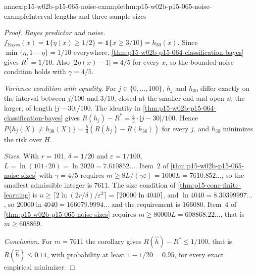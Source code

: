 \begin{annexitem}{annex:p15-w02b-p15-065-noise-example}{thm:p15-w02b-p15-065-noise-example}{Interval lengths and three sample sizes}
\begin{proof}
\emph{Bayes predictor and noise.} \(f_{\mathrm{Bayes}}(x)=
\mathbf1\{\eta(x)\geq1/2\}=\mathbf1\{x\geq3/10\}=h_{30}(x)\). Since
\(\min\{\eta,1-\eta\}=1/10\) everywhere,
\cref{thm:p15-w02b-p15-064-classification-bayes} gives \(R^{*}=1/10\).
Also \(|2\eta(x)-1|=4/5\) for every \(x\), so the bounded-noise condition
holds with \(\gamma=4/5\).

\emph{Variance condition with equality.} For \(j\in\{0,\ldots,100\}\),
\(h_j\) and \(h_{30}\) differ exactly on the interval between \(j/100\)
and \(3/10\), closed at the smaller end and open at the larger, of length
\(|j-30|/100\). The identity in
\cref{thm:p15-w02b-p15-064-classification-bayes} gives
\(R(h_j)-R^{*}=\tfrac45\cdot|j-30|/100\). Hence
\(P\{h_j(X)\ne h_{30}(X)\}=\tfrac54(R(h_j)-R(h_{30}))\) for every \(j\),
and \(h_{30}\) minimizes the risk over \(H\).

\emph{Sizes.} With \(r=101\), \(\delta=1/20\) and \(\varepsilon=1/100\),
\(L=\ln(101\cdot20)=\ln2020=7.610852\ldots\). Item~2 of
\cref{thm:p15-w02b-p15-065-noise-sizes} with \(\gamma=4/5\) requires
\(m\geq8L/(\gamma\varepsilon)=1000L=7610.852\ldots\), so the smallest
admissible integer is \(7611\). The size condition of
\cref{thm:p15-conc-finite-learning} is
\(n\geq\lceil2\ln(2r/\delta)/\varepsilon^2\rceil
=\lceil20000\ln4040\rceil\), and \(\ln4040=8.30399997\ldots\), so
\(20000\ln4040=166079.9994\ldots\) and the requirement is
\(166080\). Item~4 of \cref{thm:p15-w02b-p15-065-noise-sizes} requires
\(m\geq80000L=608868.22\ldots\), that is \(m\geq608869\).

\emph{Conclusion.} For \(m=7611\) the corollary gives
\(R(\widehat h)-R^{*}\leq1/100\), that is \(R(\widehat h)\leq0.11\), with
probability at least \(1-1/20=0.95\), for every exact empirical
minimizer.
\end{proof}
\end{annexitem}

